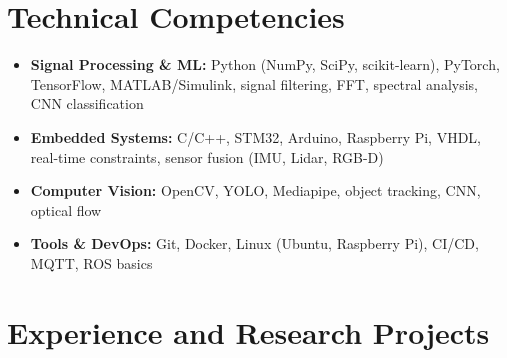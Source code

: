 \documentclass[a4paper,11pt]{article}
\begin{document}
\vspace{4pt}

\section{Technical Competencies}
\begin{itemize}[leftmargin=*, nosep]
    \item \small{\textbf{Signal Processing \& ML:} Python (NumPy, SciPy, scikit-learn), PyTorch, TensorFlow, MATLAB/Simulink, signal filtering, FFT, spectral analysis, CNN classification}
    \item \small{\textbf{Embedded Systems:} C/C++, STM32, Arduino, Raspberry Pi, VHDL, real-time constraints, sensor fusion (IMU, Lidar, RGB-D)}
    \item \small{\textbf{Computer Vision:} OpenCV, YOLO, Mediapipe, object tracking, CNN, optical flow}
    \item \small{\textbf{Tools \& DevOps:} Git, Docker, Linux (Ubuntu, Raspberry Pi), CI/CD, MQTT, ROS basics}
\end{itemize}

\vspace{4pt}

\section{Experience and Research Projects}
\end{document}
